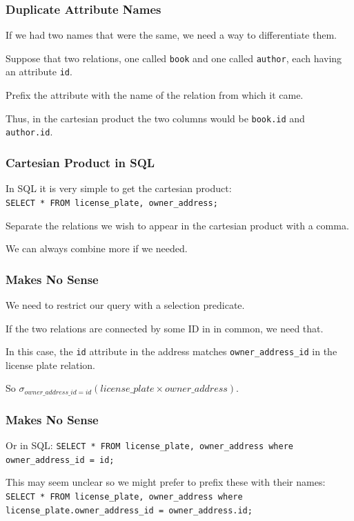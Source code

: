 \begin{frame}
\frametitle{Duplicate Attribute Names}

If we had two names that were the same, we need a way to differentiate them. 

Suppose that two relations, one called \texttt{book} and one called \texttt{author}, each having an attribute \texttt{id}. 

Prefix the attribute with the name of the relation from which it came. 

Thus, in the cartesian product the two columns would be \texttt{book.id} and \texttt{author.id}.


\end{frame}



\begin{frame}
\frametitle{Cartesian Product in SQL}

In SQL it is very simple to get the cartesian product:\\
\texttt{SELECT * FROM license\_plate, owner\_address;} 

Separate the relations we wish to appear in the cartesian product with a comma.

We can always combine more if we needed.

\end{frame}



\begin{frame}
\frametitle{Makes No Sense}

We need to restrict our query with a selection predicate. 

If the two relations are connected by some ID in in common, we need that. 

In this case, the \texttt{id} attribute in the address matches \texttt{owner\_address\_id} in the license plate relation. 

So $\sigma_{owner\_address\_id = id}( license\_plate \times owner\_address )$.

\end{frame}

\begin{frame}
\frametitle{Makes No Sense}

Or in SQL: \texttt{SELECT * FROM license\_plate, owner\_address where owner\_address\_id = id;} 

This may seem unclear so we might prefer to prefix these with their names: \texttt{SELECT * FROM license\_plate, owner\_address where license\_plate.owner\_address\_id = owner\_address.id;} 


\end{frame}



